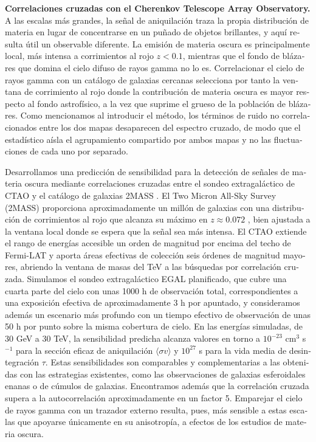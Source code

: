 \begin{otherlanguage}{spanish}
\textbf{Correlaciones cruzadas con el Cherenkov Telescope Array Observatory.} A las escalas más grandes, la señal de aniquilación traza la propia distribución de materia en lugar de concentrarse en un puñado de objetos brillantes, y aquí resulta útil un observable diferente. La emisión de materia oscura es principalmente local, más intensa a corrimientos al rojo $z < 0.1$, mientras que el fondo de blázares que domina el cielo difuso de rayos gamma no lo es. Correlacionar el cielo de rayos gamma con un catálogo de galaxias cercanas selecciona por tanto la ventana de corrimiento al rojo donde la contribución de materia oscura es mayor respecto al fondo astrofísico, a la vez que suprime el grueso de la población de blázares. Como mencionamos al introducir el método, los términos de ruido no correlacionados entre los dos mapas desaparecen del espectro cruzado, de modo que el estadístico aísla el agrupamiento compartido por ambos mapas y no las fluctuaciones de cada uno por separado.

Desarrollamos una predicción de sensibilidad para la detección de señales de materia oscura mediante correlaciones cruzadas entre el sondeo extragaláctico de CTAO y el catálogo de galaxias 2MASS \cite{Pinetti:2025hgd}.
El Two Micron All-Sky Survey (2MASS) proporciona aproximadamente un millón de galaxias con una distribución de corrimientos al rojo que alcanza su máximo en $z \approx 0.072$ \cite{2MASS:2006qir}, bien ajustada a la ventana local donde se espera que la señal sea más intensa.
El CTAO \cite{CTAConsortium:2017dvg} extiende el rango de energías accesible un orden de magnitud por encima del techo de Fermi-LAT y aporta áreas efectivas de colección seis órdenes de magnitud mayores, abriendo la ventana de masas del TeV a las búsquedas por correlación cruzada. Simulamos el sondeo extragaláctico EGAL planificado, que cubre una cuarta parte del cielo con unas 1000 h de observación total, correspondientes a una exposición efectiva de aproximadamente 3 h por apuntado, y consideramos además un escenario más profundo con un tiempo efectivo de observación de unas 50 h por punto sobre la misma cobertura de cielo. En las energías simuladas, de 30 GeV a 30 TeV, la sensibilidad predicha alcanza valores en torno a $10^{-23}$ cm$^3$ s$^{-1}$ para la sección eficaz de aniquilación $\langle \sigma v \rangle$ y $10^{27}$ s para la vida media de desintegración $\tau$. Estas sensibilidades son comparables y complementarias a las obtenidas con las estrategias existentes, como las observaciones de galaxias esferoidales enanas o de cúmulos de galaxias. Encontramos además que la correlación cruzada supera a la autocorrelación aproximadamente en un factor 5. Emparejar el cielo de rayos gamma con un trazador externo resulta, pues, más sensible a estas escalas que apoyarse únicamente en su anisotropía, a efectos de los estudios de materia oscura.


\end{otherlanguage}

